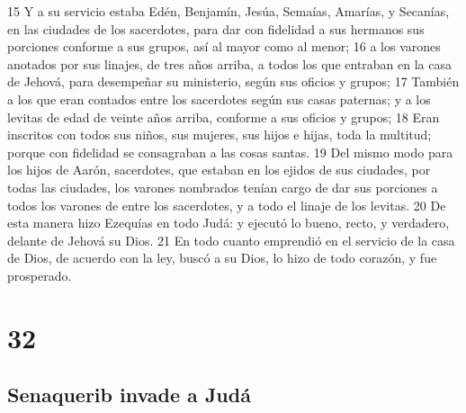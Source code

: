 15 Y a su servicio estaba Edén, Benjamín, Jesúa, Semaías, Amarías, y Secanías, en las ciudades de los sacerdotes, para dar con fidelidad a sus hermanos sus porciones conforme a sus grupos, así al mayor como al menor;
16 a los varones anotados por sus linajes, de tres años arriba, a todos los que entraban en la casa de Jehová, para desempeñar su ministerio, según sus oficios y grupos;
17 También a los que eran contados entre los sacerdotes según sus casas paternas; y a los levitas de edad de veinte años arriba, conforme a sus oficios y grupos;
18 Eran inscritos con todos sus niños, sus mujeres, sus hijos e hijas, toda la multitud; porque con fidelidad se consagraban a las cosas santas.
19 Del mismo modo para los hijos de Aarón, sacerdotes, que estaban en los ejidos de sus ciudades, por todas las ciudades, los varones nombrados tenían cargo de dar sus porciones a todos los varones de entre los sacerdotes, y a todo el linaje de los levitas.
20 De esta manera hizo Ezequías en todo Judá: y ejecutó lo bueno, recto, y verdadero, delante de Jehová su Dios.
21 En todo cuanto emprendió en el servicio de la casa de Dios, de acuerdo con la ley, buscó a su Dios, lo hizo de todo corazón, y fue prosperado.

\chapter{32}

\section*{Senaquerib invade a Judá }

